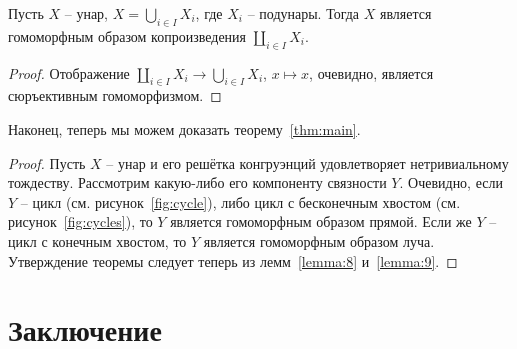 \documentclass[11pt,twoside,final
]{article}
\begin{document}
\begin{lemma} \label{lemma:9}
	Пусть $X$ -- унар, $X = \bigcup_{i \in I} X_i$, где $X_i$ -- подунары.
	Тогда $X$ является гомоморфным образом копроизведения $\coprod_{i \in I} X_i$.
\end{lemma}
\begin{proof}
	Отображение $\coprod_{i \in I} X_i \rightarrow \bigcup_{i \in I} X_i$, $x \mapsto x$, очевидно, является сюръективным гомоморфизмом.
\end{proof}

Наконец, теперь мы можем доказать теорему~\ref{thm:main}.

\begin{proof}
	Пусть $X$ -- унар и его решётка конгруэнций удовлетворяет нетривиальному тождеству.
	Рассмотрим какую-либо его компоненту связности $Y$.
	Очевидно, если $Y$ -- цикл (см. рисунок~\ref{fig:cycle}), либо цикл с бесконечным хвостом (см. рисунок~\ref{fig:cycles}), то $Y$ является гомоморфным образом прямой.
	Если же $Y$ -- цикл с конечным хвостом, то $Y$ является гомоморфным образом луча.
	Утверждение теоремы следует теперь из лемм~\ref{lemma:8} и~\ref{lemma:9}.
\end{proof}


\section{Заключение}
\end{document}
